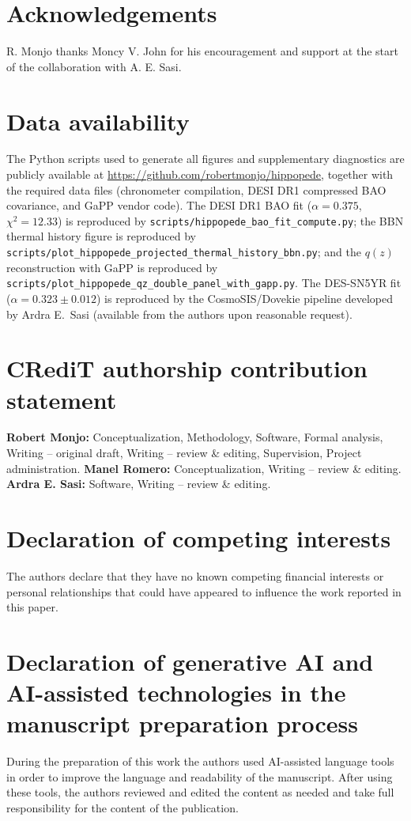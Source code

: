 \documentclass[preprint,12pt]{elsarticle}
\begin{document}
\section*{Acknowledgements}
R. Monjo thanks Moncy V. John for his encouragement and support at the start of the collaboration with A. E. Sasi.

\section*{Data availability}

The Python scripts used to generate all figures and supplementary diagnostics are publicly available at \url{https://github.com/robertmonjo/hippopede}, together with the required data files (chronometer compilation, DESI DR1 compressed BAO covariance, and GaPP vendor code). The DESI DR1 BAO fit ($\alpha=0.375$, $\chi^2=12.33$) is reproduced by \texttt{scripts/hippopede\_bao\_fit\_compute.py}; the BBN thermal history figure is reproduced by \texttt{scripts/plot\_hippopede\_projected\_thermal\_history\_bbn.py}; and the $q(z)$ reconstruction with GaPP is reproduced by \texttt{scripts/plot\_hippopede\_qz\_double\_panel\_with\_gapp.py}. The DES-SN5YR fit ($\alpha=0.323\pm0.012$) is reproduced by the CosmoSIS/Dovekie pipeline developed by Ardra E.\ Sasi (available from the authors upon reasonable request).

\section*{CRediT authorship contribution statement}
\textbf{Robert Monjo:} Conceptualization, Methodology, Software, Formal analysis, Writing -- original draft, Writing -- review \& editing, Supervision, Project administration. \textbf{Manel Romero:} Conceptualization, Writing -- review \& editing. \textbf{Ardra E. Sasi:} Software, Writing -- review \& editing.

\section*{Declaration of competing interests}
The authors declare that they have no known competing financial interests or personal relationships that could have appeared to influence the work reported in this paper.

\section*{Declaration of generative AI and AI-assisted technologies in the manuscript preparation process}
During the preparation of this work the authors used AI-assisted language tools in order to improve the language and readability of the manuscript. After using these tools, the authors reviewed and edited the content as needed and take full responsibility for the content of the publication.
\end{document}
